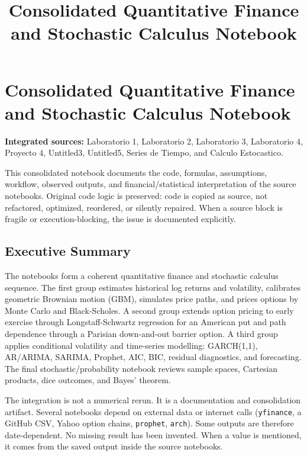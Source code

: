 \documentclass[
  11pt,
]{article}
\title{Consolidated Quantitative Finance and Stochastic Calculus Notebook}
\author{}
\date{}
\begin{document}
\maketitle

\section{Consolidated Quantitative Finance and Stochastic Calculus Notebook}\label{consolidated-quantitative-finance-and-stochastic-calculus-notebook}

\textbf{Integrated sources:} Laboratorio 1, Laboratorio 2, Laboratorio 3, Laboratorio 4, Proyecto 4, Untitled3, Untitled5, Series de Tiempo, and Calculo Estocastico.

This consolidated notebook documents the code, formulas, assumptions, workflow, observed outputs, and financial/statistical interpretation of the source notebooks. Original code logic is preserved: code is copied as source, not refactored, optimized, reordered, or silently repaired. When a source block is fragile or execution-blocking, the issue is documented explicitly.

\subsection{Executive Summary}\label{executive-summary}

The notebooks form a coherent quantitative finance and stochastic calculus sequence. The first group estimates historical log returns and volatility, calibrates geometric Brownian motion (GBM), simulates price paths, and prices options by Monte Carlo and Black-Scholes. A second group extends option pricing to early exercise through Longstaff-Schwartz regression for an American put and path dependence through a Parisian down-and-out barrier option. A third group applies conditional volatility and time-series modelling: GARCH(1,1), AR/ARIMA, SARIMA, Prophet, AIC, BIC, residual diagnostics, and forecasting. The final stochastic/probability notebook reviews sample spaces, Cartesian products, dice outcomes, and Bayes' theorem.

The integration is not a numerical rerun. It is a documentation and consolidation artifact. Several notebooks depend on external data or internet calls (\texttt{yfinance}, a GitHub CSV, Yahoo option chains, \texttt{prophet}, \texttt{arch}). Some outputs are therefore date-dependent. No missing result has been invented. When a value is mentioned, it comes from the saved output inside the source notebooks.
\end{document}

